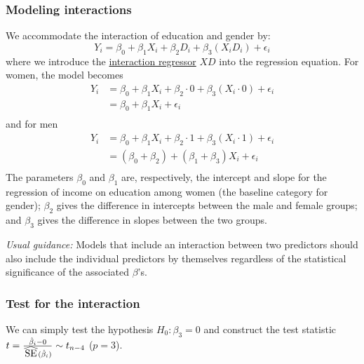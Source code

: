 \subsubsection*{Modeling interactions}
We accommodate the interaction of education and gender by:
$$
Y_i = \beta_0 + \beta_1 X_{i} + \beta_2 D_{i} + \beta_3 (X_i D_i) + \epsilon_i
$$
where we introduce the \underline{interaction regressor} $XD$ into the regression equation.
For women, the model becomes
$$
\begin{aligned}
Y_i &= \beta_0 + \beta_1 X_{i} + \beta_2 \cdot 0 + \beta_3 (X_i \cdot 0) + \epsilon_i\\
&= \beta_0 + \beta_1 X_i + \epsilon_i\\
\end{aligned}
$$
%
and for men
$$
\begin{aligned}
Y_i &= \beta_0 + \beta_1 X_{i} + \beta_2 \cdot 1 + \beta_3 (X_i \cdot 1) + \epsilon_i\\
&= (\beta_0 + \beta_2) + (\beta_1 + \beta_3) X_i + \epsilon_i\\
\end{aligned}
$$
The parameters $\beta_0$ and $\beta_1$ are, respectively, the intercept and slope for the regression of income on education among women (the baseline category for gender);
$\beta_2$ gives the difference in intercepts between the male and female groups;
and $\beta_3$ gives the difference in slopes between the two groups.

{\it Usual guidance: } Models that include an interaction between two predictors should also include the individual predictors by themselves regardless of the statistical significance of the associated $\beta$'s.

\subsubsection*{Test for the interaction}
We can simply test the hypothesis $H_0: \beta_3 = 0$ and construct the test statistic $t = \frac{\hat{\beta}_i - 0}{\reallywidehat{SE}(\hat{\beta}_i) } \sim t_{n - 4}$ ($p = 3$).

